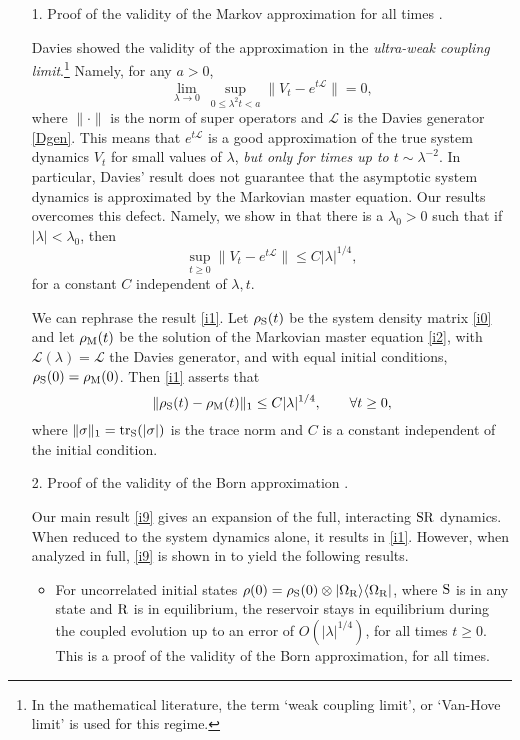 \documentclass[letterpaper,onecolumn,11pt,accepted=2021-12-09]{quantumarticle}
\numberwithin{equation}{section}
\newcommand{\m}{{\rm M}}
\renewcommand{\r}{{\rm R}}
\newcommand{\s}{{\rm S}}
\begin{document}
\begin{itemize}
	\item[1.] Proof of the validity of the Markov approximation for all times \cite{Markov2}.
	
	Davies \cite{Da1,Da2} showed the validity of the approximation in the {\em ultra-weak coupling limit}.\footnote{In the mathematical literature, the term `weak coupling limit', or `Van-Hove limit' is used for this regime.} Namely, for any $a>0$,
	$$
	\lim_{\lambda\rightarrow 0}\ \sup_{0\le \lambda^2t<a}\|V_t -e^{t{\mathcal L}} \| =0,
	$$
	where $\|\cdot\|$ is the norm of super operators and $\mathcal L$ is the Davies generator \eqref{Dgen}.  This means that $e^{t{\mathcal L}}$ is a good approximation of the true system dynamics $V_t$ for small values of $\lambda$, {\em but only for times up to $t\sim \lambda^{-2}$}. In particular, Davies' result does not guarantee that the asymptotic system dynamics is approximated by the Markovian master equation. Our results overcomes this defect. Namely, we show in \cite{Markov2} that there is a $\lambda_0>0$ such that if $|\lambda|<\lambda_0$, then
	\begin{equation}
	\label{i1}
	\sup_{t\ge 0}\|V_t -e^{t{\mathcal L}} \| \le C|\lambda|^{1/4},
	\end{equation}
	for a constant $C$ independent of $\lambda, t$.
	
	We can rephrase the result \eqref{i1}. Let $\rho_\s(t)$ be the system density matrix \eqref{i0} and let $\rho_\m(t)$ be the solution of the Markovian master equation \eqref{i2}, with ${\mathcal L}(\lambda) = {\mathcal L}$ the Davies generator, and with equal initial conditions, $\rho_\s(0)=\rho_\m(0)$. Then \eqref{i1} asserts that
	$$
	\|\rho_\s(t)-\rho_\m(t)\|_1 \le C|\lambda|^{1/4},\qquad \forall t\ge 0,
	$$ 
	where $\|\sigma\|_1={\rm tr}_\s(|\sigma|)$ is the trace norm and $C$ is a constant independent of the initial condition. 
	
	
	
	
	\item[2.] Proof of the validity of the Born approximation \cite{Mcorr}.
	
	Our main result \eqref{i9} gives an expansion of the full, interacting $\s\r$ dynamics. When reduced to the system dynamics alone, it results in \eqref{i1}. However, when analyzed in full, \eqref{i9} is shown in \cite{Mcorr} to yield the following results.
	\begin{itemize} 
		\item For uncorrelated initial states $\rho(0) = \rho_\s(0)\otimes|\Omega_\r\rangle\langle\Omega_\r|$, where $\s$ is in any state and $\r$ is in equilibrium, the reservoir stays in equilibrium  during the coupled evolution up to an error of $O({|\lambda|^{1/4}})$, for all times $t\ge 0$. This is a proof of the validity of the Born approximation, for all times. 
		

\end{itemize}
\end{itemize}
\end{document}
